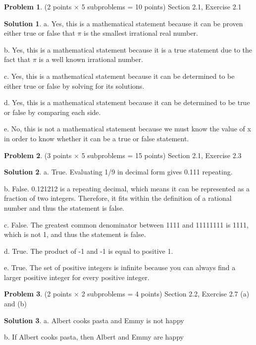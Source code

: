 \documentclass{article}
\theoremstyle{definition}
\newtheorem{problem}{Problem}
\newtheorem*{solution}{Solution}
\begin{document}
\newpage
\begin{problem} (2 points $\times$ 5 subproblems = 10 points) Section 2.1, Exercise 2.1
\end{problem}
\begin{solution}
a. Yes, this is a mathematical statement because it can be proven either true or false that $\pi$ is the smallest irrational real number.

b. Yes, this is a mathematical statement because it is a true statement due to the fact that $\pi$ is a well known irrational number.

c. Yes, this is a mathematical statement because it can be determined to be either true or false by solving for its solutions.

d. Yes, this is a mathematical statement because it can be determined to be true or false by comparing each side.

e. No, this is not a mathematical statement because we must know the value of x in order to know whether it can be a true or false statement.
\end{solution}

\newpage
\begin{problem} (3 points $\times$ 5 subproblems = 15 points) Section 2.1, Exercise 2.3
\end{problem}
\begin{solution}
a. True. Evaluating 1/9 in decimal form gives 0.111 repeating.

b. False. 0.121212 is a repeating decimal, which means it can be represented as a fraction of two integers. Therefore, it fits within the definition of a rational number and thus the statement is false.

c. False. The greatest common denominator between 1111 and 11111111 is 1111, which is not 1, and thus the statement is false.

d. True. The product of -1 and -1 is equal to positive 1.

e. True. The set of positive integers is infinite because you can always find a larger positive integer for every positive integer.
\end{solution}

\newpage
\begin{problem} (2 points $\times$ 2 subproblems = 4 points) Section 2.2, Exercise 2.7 (a) and (b)
\end{problem}
\begin{solution}
a. Albert cooks pasta and Emmy is not happy

b. If Albert cooks pasta, then Albert and Emmy are happy
\end{solution}
\end{document}
